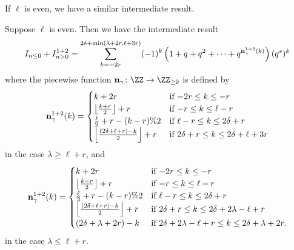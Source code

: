 If $\ell$ is even, we have a similar intermediate result.
\begin{proposition}
  Suppose $\ell$ is even.
  Then we have the intermediate result
  \[
    I_{n \le 0} + I_{n > 0}^{\text{1+2}}
    = \sum_{k = -2r}^{2\delta + \min(\lambda+2r, \ell+3r)}
    (-1)^k \left( 1 + q + q^2 + \dots + q^{\mathbf n^{1+2}_{\gamma}(k)}  \right) (q^s)^k
  \]
  where the piecewise function $\nn_\gamma \colon \ZZ \to \ZZ_{\ge 0}$ is defined by
  \[
    \mathbf n^{1+2}_\gamma(k) =
    \begin{cases}
      k + 2r & \text{if } {-2r} \le k \le -r \\
      \left\lfloor \frac{k+r}{2} \right\rfloor + r & \text{if }{-r} \le k \le \ell-r \\
      \frac{\ell}{2} + r - (k-r)\%2 & \text{if } \ell - r \le k \le 2\delta + r \\
      \left\lfloor \frac{(2\delta+\ell+r)-k}{2} \right\rfloor + r & \text{if } 2\delta + r \le k \le 2\delta + \ell + 3r
    \end{cases}
  \]
  in the case $\lambda \ge \ell+r$, and
  \[
    \mathbf n^{1+2}_\gamma(k) =
    \begin{cases}
      k + 2r & \text{if } {-2r} \le k \le -r \\
      \left\lfloor \frac{k+r}{2} \right\rfloor + r & \text{if }{-r} \le k \le \ell-r \\
      \frac{\ell}{2} + r - (k-r) \% 2 & \text{if } \ell - r \le k \le 2\delta + r \\
      \left\lfloor \frac{(2\delta+\ell+r)-k}{2} \right\rfloor + r & \text{if } 2\delta + r \le k \le 2\delta + 2\lambda - \ell + r \\
      (2\delta + \lambda + 2r) - k & \text{if } 2 \delta + 2 \lambda - \ell + r \le k \le 2 \delta + \lambda + 2r.
    \end{cases}
  \]
  in the case $\lambda \le \ell+r$.

\end{proposition}

